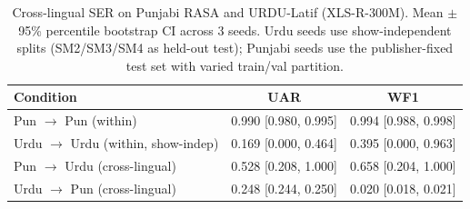 \begin{table}[t]
\centering
\caption{Cross-lingual SER on Punjabi RASA and URDU-Latif (XLS-R-300M). Mean $\pm$ 95\% percentile bootstrap CI across 3 seeds. Urdu seeds use show-independent splits (SM2/SM3/SM4 as held-out test); Punjabi seeds use the publisher-fixed test set with varied train/val partition.}
\label{tab:multiseed_xlingual}
\begin{tabular}{lcc}
\toprule
Condition & UAR & WF1 \\
\midrule
Pun $\rightarrow$ Pun  (within) & 0.990 [0.980, 0.995] & 0.994 [0.988, 0.998] \\
Urdu $\rightarrow$ Urdu (within, show-indep) & 0.169 [0.000, 0.464] & 0.395 [0.000, 0.963] \\
Pun $\rightarrow$ Urdu (cross-lingual) & 0.528 [0.208, 1.000] & 0.658 [0.204, 1.000] \\
Urdu $\rightarrow$ Pun (cross-lingual) & 0.248 [0.244, 0.250] & 0.020 [0.018, 0.021] \\
\bottomrule
\end{tabular}
\end{table}
